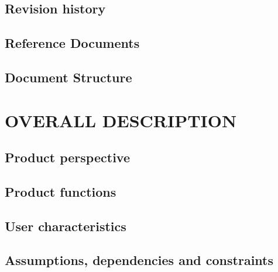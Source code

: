 \documentclass[11pt]{report}
\begin{document}
		\section{Revision history}
		\label{sect:Revision history}
			
			
		\section{Reference Documents}
		\label{sect:Documents}
			
			
		\section{Document Structure}
		\label{sect:Document Structure}
			
			
	\chapter{OVERALL DESCRIPTION}
	\label{ch:OVERALL DESCRIPTION}
	
		\section{Product perspective}
		\label{sect:Product perspective}
			
			
			
		\section{Product functions}
		\label{sect:Product functions}
			
			
		\section{User characteristics}
		\label{sect:User characteristics}
			
			
		\section{Assumptions, dependencies and constraints}
		\label{sect:Assumptions, dependencies and constraints}
			
			
\end{document}

